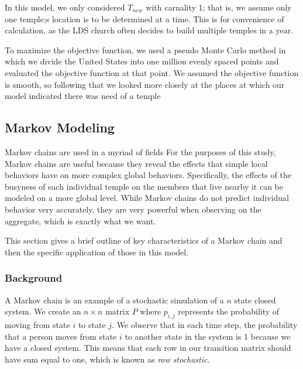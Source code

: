 \documentclass[twoside,twocolumn]{article}
\begin{document}
In this model, we only considered $T_{new}$ with carnality 1; that is, we assume only one temple;s location is to be determined at a time. 
This is for convenience of calculation, as the LDS church often decides to build multiple temples in a year. %

To maximize the objective function, we used a pseudo Monte Carlo method in which we divide the United States into one million evenly spaced points and evaluated the objective function at that point.
We assumed the objective function is smooth, so following that we looked more closely at the places at which our model indicated there was need of a temple %


\subsection{Markov Modeling}

Markov chains are used in a myriad of fields
 For the purposes of this study, Markov chains are useful because they reveal the effects that simple local behaviors have on more complex global behaviors.
Specifically, the effects of the busyness of each individual temple on the members that live nearby it can be modeled on a more global level.
While Markov chains do not predict individual behavior very accurately, they are very powerful when observing on the aggregate, which is exactly what we want.

This section gives a brief outline of key characteristics of a Markov chain and then the specific application of those in this model.

\subsubsection{Background}

A Markov chain is an example of a stochastic simulation of a $n$ state closed system. %
We create an $n\times n$ matrix $P$ where $p_{i,j}$ represents the probability of moving from state $i$ to state $j$.
We observe that in each time step, the probability that a person moves from state $i$ to another state in the system is 1 because we have a closed system.
This means that each row in our transition matrix should have sum equal to one, which is known as {\em row stochastic}.
\end{document}
